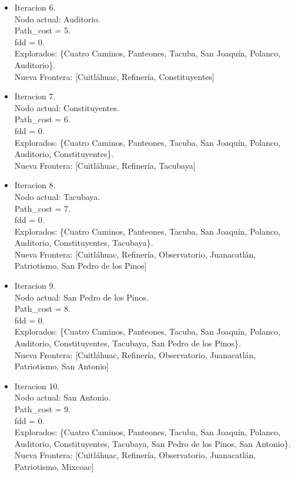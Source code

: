 \documentclass[10pt,a4paper]{article}
\begin{document}
\begin{itemize}
    \item Iteracion 6.\\
    Nodo actual: Auditorio.\\
    Path\_cost = 5.\\
    fdd = 0.\\
    Explorados: \{Cuatro Caminos, Panteones, Tacuba, San Joaquín, Polanco, Auditorio\}.\\
    Nueva Frontera: [Cuitláhuac, Refinería, Constituyentes]

    \item Iteracion 7.\\
    Nodo actual: Constituyentes.\\
    Path\_cost = 6.\\
    fdd = 0.\\
    Explorados: \{Cuatro Caminos, Panteones, Tacuba, San Joaquín, Polanco, Auditorio, Constituyentes\}.\\
    Nueva Frontera: [Cuitláhuac, Refinería, Tacubaya]

    \item Iteracion 8.\\
    Nodo actual: Tacubaya.\\
    Path\_cost = 7.\\
    fdd = 0.\\
    Explorados: \{Cuatro Caminos, Panteones, Tacuba, San Joaquín, Polanco, Auditorio, Constituyentes, Tacubaya\}.\\
    Nueva Frontera: [Cuitláhuac, Refinería, Observatorio, Juanacatlán, Patriotismo, San Pedro de los Pinos]

    \item Iteracion 9.\\
    Nodo actual: San Pedro de los Pinos.\\
    Path\_cost = 8.\\
    fdd = 0.\\
    Explorados: \{Cuatro Caminos, Panteones, Tacuba, San Joaquín, Polanco, Auditorio, Constituyentes, Tacubaya, San Pedro de los Pinos\}.\\
    Nueva Frontera: [Cuitláhuac, Refinería, Observatorio, Juanacatlán, Patriotismo, San Antonio]

    \item Iteracion 10.\\
    Nodo actual: San Antonio.\\
    Path\_cost = 9.\\
    fdd = 0.\\
    Explorados: \{Cuatro Caminos, Panteones, Tacuba, San Joaquín, Polanco, Auditorio, Constituyentes, Tacubaya, San Pedro de los Pinos, San Antonio\}.\\
    Nueva Frontera: [Cuitláhuac, Refinería, Observatorio, Juanacatlán, Patriotismo, Mixcoac]
    

\end{itemize}
\end{document}
